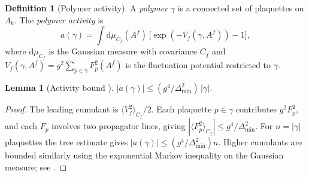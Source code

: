 \documentclass[11pt,a4paper]{amsart}
\newtheorem{lemma}[theorem]{Lemma}
\theoremstyle{definition}
\newtheorem{definition}[theorem]{Definition}
\newcommand{\Del}{\Delta_{\min}}
\newcommand{\Cf}{C_f}
\begin{document}
\begin{definition}[Polymer activity]
\label{def:activity}
A \emph{polymer} $\gamma$ is a connected set of plaquettes on $\Lambda_k$.
The \emph{polymer activity} is
\[
  a(\gamma) = \int \mathrm{d}\mu_{\Cf}(A^f)\,
              \bigl[\exp(-V_f(\gamma, A^f)) - 1\bigr],
\]
where $\mathrm{d}\mu_{\Cf}$ is the Gaussian measure with covariance $\Cf$
and $V_f(\gamma, A^f) = g^2\sum_{p\in\gamma} F_p^2(A^f)$ is the
fluctuation potential restricted to $\gamma$.
\end{definition}

\begin{lemma}[Activity bound {\cite[Prop.~2.3]{B87}}]
\label{lem:activity}
$|a(\gamma)| \le (g^4/\Del^2)\,|\gamma|$.
\end{lemma}
\begin{proof}
The leading cumulant is $\langle V_f^2\rangle_{\Cf}/2$.
Each plaquette $p\in\gamma$ contributes $g^2 F_p^2$, and each $F_p$ involves
two propagator lines, giving $|\langle F_p^2\rangle_{\Cf}|\le g^4/\Del^2$.
For $n = |\gamma|$ plaquettes the tree estimate gives
$|a(\gamma)|\le (g^4/\Del^2)n$.
Higher cumulants are bounded similarly using the exponential Markov inequality
on the Gaussian measure; see \cite[§2]{B87}.
\end{proof}
\end{document}
